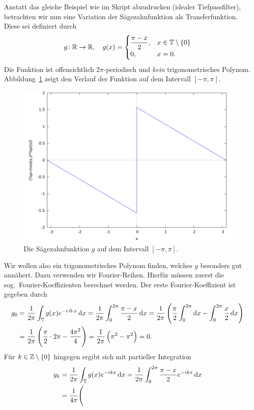 \begin{example}
Anstatt das gleiche Beispiel wie im Skript abzudrucken (idealer Tiefpassfilter), betrachten wir nun
eine Variation der Sägezahnfunktion als Transferfunktion. Diese sei definiert durch
\[
  g \colon \mathbb{R} \rightarrow \mathbb{R}, \quad g(x) = \begin{cases}
    \dfrac{\pi - x}{2}, & x \in \mathbb{T} \setminus \{ 0 \} \\
    0, & x = 0.
  \end{cases}
\]
Die Funktion ist offensichtlich $ 2\pi $-periodisch und \emph{kein} trigonometrisches Polynom. 
Abbildung~\ref{fig:sawtooth} zeigt den Verlauf der Funktion auf dem Intervall $ [-\pi, \pi] $.
\begin{figure}[ht]
\centering
\includegraphics[width=0.5\linewidth]{Bilder/sawtooth}
\caption{Die Sägezahnfunktion $ g $ auf dem Intervall $ [-\pi, \pi] $.}
\label{fig:sawtooth}
\end{figure}
Wir wollen also ein trigonometrisches Polynom finden, welches $ g $ besonders gut annähert. Dazu
verwenden wir Fourier-Reihen. Hierfür müssen zuerst die sog.\ Fourier-Koeffizienten berechnet 
werden. Der erste Fourier-Koeffizient ist gegeben durch
\begin{align*}
   g_{0} 
&= \frac{1}{2\pi} \int_{\T} g(x) e^{- i \cdot 0 \cdot x} \dif x
 = \frac{1}{2\pi} \int_{0}^{2\pi} \frac{\pi - x}{2} \dif x
 = \frac{1}{2\pi} \left( 
     \frac{\pi}{2} \int_{0}^{2\pi} \dif x - \int_{0}^{2\pi} \frac{x}{2} \dif x
   \right) \\
&= \frac{1}{2\pi} \left( \frac{\pi}{2} \cdot 2\pi - \frac{4\pi^{2}}{4} \right)
 = \frac{1}{2\pi} \left( \pi^{2} - \pi^{2} \right)
 = 0.
\end{align*}
Für $ k \in \mathbb{Z} \setminus \{ 0 \} $ hingegen ergibt sich mit partieller Integration
\begin{align*}
   g_{k}
&= \frac{1}{2\pi} \int_{\T} g(x) e^{-ikx} \dif x
 = \frac{1}{2\pi} \int_{0}^{2\pi} \frac{\pi - x}{2} e^{-ikx} \dif x \\
&= \frac{1}{4\pi} \Bigg( 

\end{align*}
\end{example}
